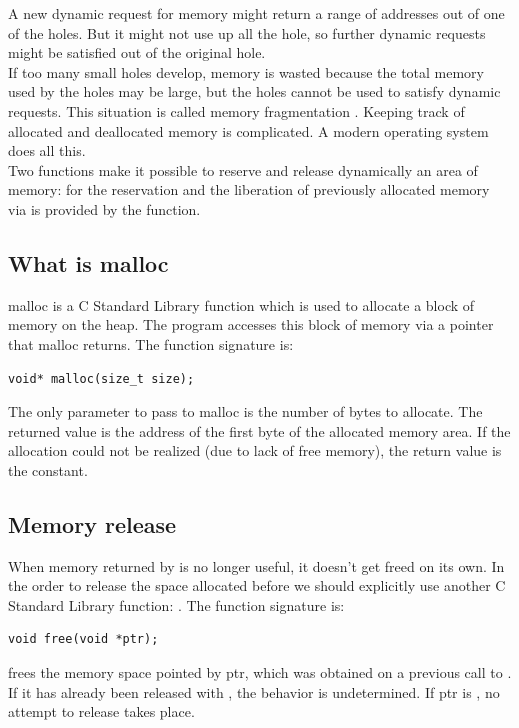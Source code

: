 A new dynamic request for memory might return a range of addresses out of one of the holes. But it might not use up all the hole, so further dynamic requests might be satisfied out of the original hole.\\

If too many small holes develop, memory is wasted because the total memory used by the holes may be large, but the holes cannot be used to satisfy dynamic requests. This situation is called memory fragmentation \cite{Knuth73a}. Keeping track of allocated and deallocated memory is complicated. A modern operating system does all this.\\

Two functions make it possible to reserve and release dynamically an area of memory:  for the reservation and the liberation of previously allocated memory via  is provided by the  function.

\subsection{What is malloc}
malloc is a C Standard Library function which is used to allocate a block of memory on the heap. The program accesses this block of memory via a pointer that malloc returns.
The function signature is:

\begin{lstlisting}[style=cstyle]
void* malloc(size_t size);
\end{lstlisting}

The only parameter to pass to malloc is the number of bytes to allocate. The returned value is the address of the first byte of the allocated memory area. If the allocation could not be realized (due to lack of free memory), the return value is the  constant.

\subsection{Memory release}
When memory returned by  is no longer useful, it doesn't get freed on its own. In the order to release the space allocated before we should explicitly use another C Standard Library function:  .
The function signature is:
\begin{lstlisting}[style=cstyle]
void free(void *ptr);
\end{lstlisting}
 frees the memory space pointed by ptr, which was obtained on a previous call to . If it has already been released with , the behavior is undetermined. If ptr is , no attempt to release takes place.

